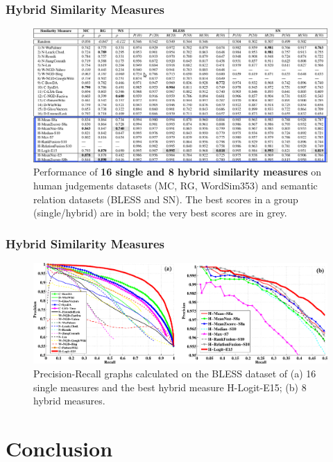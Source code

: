 \documentclass{beamer}
\begin{document}
\begin{frame}
\frametitle{Hybrid Similarity Measures}

	\begin{figure}
	\centering
		\includegraphics[width=1.0\textwidth]{figures/table-hybrid-hybrid}
		
		\caption{ Performance of \textbf{16 single and 8 hybrid similarity measures} on human judgements datasets (MC, RG,
WordSim353) and semantic relation datasets (BLESS and SN). The best scores in a group (single/hybrid) are in
bold; the very best scores are in grey. }
\end{figure}
	
	
\end{frame}

\begin{frame}
 \frametitle{Hybrid Similarity Measures}
	\begin{figure}
	\centering
		\includegraphics[width=1.0\textwidth]{figures/pr}
		\caption{Precision-Recall graphs calculated on the BLESS dataset of (a) 16 single measures and the best hybrid
measure H-Logit-E15; (b) 8 hybrid measures.}
\end{figure}
	
\end{frame}

\section{Conclusion}
\end{document}
